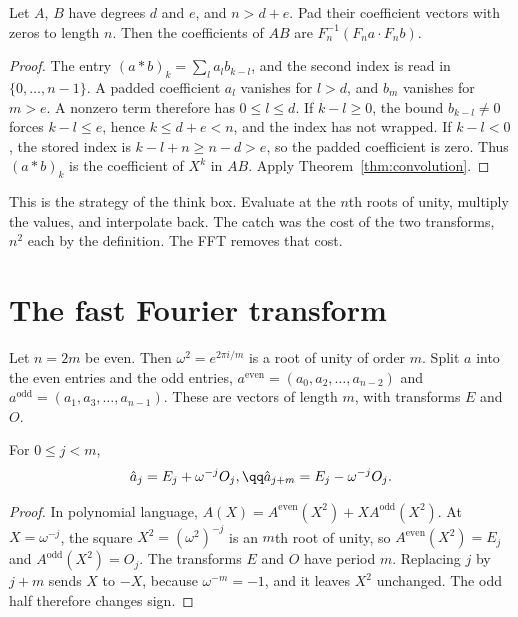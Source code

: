 \begin{corollary}\label{cor:polymul}
Let $A$, $B$ have degrees $d$ and $e$, and $n>d+e$. Pad their coefficient vectors with zeros to length $n$. Then the coefficients of $AB$
are $F_n^{-1}(F_na\cdot F_nb)$.
\end{corollary}
\begin{proof}
The entry $(a*b)_k=\sum_l a_l b_{k-l}$, and the second index is read in $\{0,\dots,n-1\}$. A padded coefficient $a_l$ vanishes for $l>d$, and $b_m$ vanishes for $m>e$. A nonzero term therefore has $0\le l\le d$. If $k-l\ge0$, the bound $b_{k-l}\ne0$ forces $k-l\le e$, hence $k\le d+e<n$, and the index has not wrapped. If $k-l<0$, the stored index is $k-l+n\ge n-d>e$, so the padded coefficient is zero. Thus $(a*b)_k$ is the coefficient of $X^k$ in $AB$. Apply Theorem~\ref{thm:convolution}.
\end{proof}

This is the strategy of the think box. Evaluate at the $n$th roots of unity, multiply the values, and interpolate back. The catch was the cost of the two transforms, $n^2$ each by the definition. The FFT removes that cost.

\section{The fast Fourier transform}

Let $n=2m$ be even. Then $\omega^2=e^{2\pi i/m}$ is a root of unity of order $m$. Split $a$ into the even entries and the odd entries, $a^{\mathrm{even}}=(a_0,a_2,\dots,a_{n-2})$ and $a^{\mathrm{odd}}=(a_1,a_3,\dots,a_{n-1})$. These are vectors of length $m$, with transforms $E$ and $O$.

\begin{lemma}[butterfly]\label{lem:butterfly}
For $0\le j<m$,
\[
\begin{gathered}\hat a_j=E_j+\omega^{-j}O_j,\qq\hat a_{j+m}=E_j-\omega^{-j}O_j.\end{gathered}
\]
\end{lemma}
\begin{proof}
In polynomial language, $A(X)=A^{\mathrm{even}}(X^2)+XA^{\mathrm{odd}}(X^2)$. At $X=\omega^{-j}$, the square $X^2=(\omega^2)^{-j}$ is an $m$th root of unity, so $A^{\mathrm{even}}(X^2)=E_j$ and $A^{\mathrm{odd}}(X^2)=O_j$. The transforms $E$ and $O$ have period $m$. Replacing $j$ by $j+m$ sends $X$ to $-X$, because $\omega^{-m}=-1$, and it leaves $X^2$ unchanged. The odd half therefore changes sign.
\end{proof}

